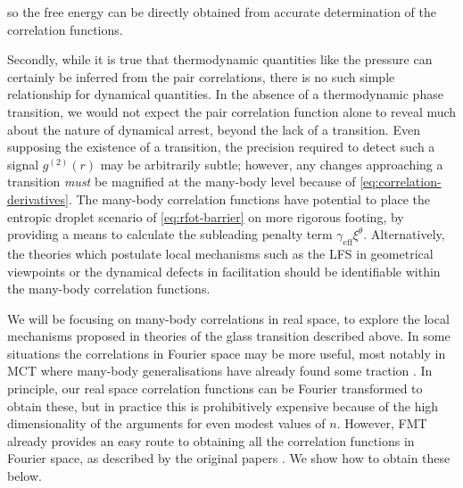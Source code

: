 \documentclass[11pt,twoside]{report}
\begin{document}
so the free energy can be directly obtained from accurate determination of the correlation functions.

Secondly, while it is true that thermodynamic quantities like the pressure can certainly be inferred from the pair correlations, there is no such simple relationship for dynamical quantities.
In the absence of a thermodynamic phase transition, we would not expect the pair correlation function alone to reveal much about the nature of dynamical arrest, beyond the lack of a transition.
Even supposing the existence of a transition, the precision required to detect such a signal $g^{(2)}(r)$ may be arbitrarily subtle; however, any changes approaching a transition \emph{must} be magnified at the many-body level because of \eqref{eq:correlation-derivatives}.
The many-body correlation functions have potential to place the entropic droplet scenario of \eqref{eq:rfot-barrier} on more rigorous footing, by providing a means to calculate the subleading penalty term $\gamma_\mathrm{eff} \xi^\theta$.
Alternatively, the theories which postulate local mechanisms such as the LFS in geometrical viewpoints or the dynamical defects in facilitation should be identifiable within the many-body correlation functions.

We will be focusing on many-body correlations in real space, to explore the local mechanisms proposed in theories of the glass transition described above.
In some situations the correlations in Fourier space may be more useful, most notably in MCT where many-body generalisations have already found some traction \cite{JanssenPRL2015,JanssenFP2018}.
In principle, our real space correlation functions can be Fourier transformed to obtain these, but in practice this is prohibitively expensive because of the high dimensionality of the arguments for even modest values of $n$.
However, FMT already provides an easy route to obtaining all the correlation functions in Fourier space, as described by the original papers \cite{RosenfeldPRL1989,RosenfeldJCP1990}.
We show how to obtain these below.
\end{document}
